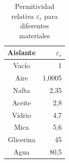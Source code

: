 \documentclass[../main]{subfiles}
\begin{document}
\begin{table}[h]
    \centering
    \begin{tabular}{|c|r|} \hline
        Aislante &  $\varepsilon_r$ \\ \hline \hline
        Vacío & 1\\ \hline
         Aire & 1,0005\\\hline
         Nafta & 2,35\\\hline
         Aceite & 2,8\\\hline
         Vidrio & 4,7\\\hline
         Mica & 5,6\\\hline
         Glicerina & 45\\\hline
         Agua & 80,5\\ \hline
     \end{tabular}
    \caption{Permitividad relativa $\varepsilon_r$ para diferentes materiales}
\end{table}



\end{document}

